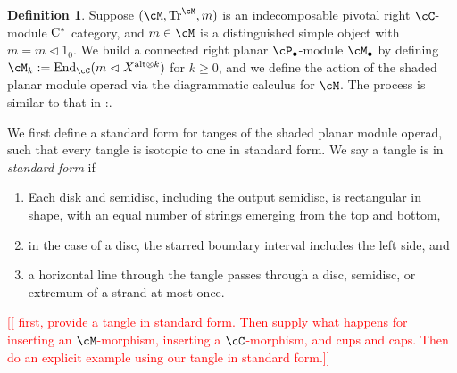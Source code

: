 \documentclass[11pt]{article}
\theoremstyle{plain}
\theoremstyle{definition}
\newtheorem{defn}[thm]{Definition}
\DeclareMathOperator{\End}{End}
\DeclareMathOperator{\Tr}{Tr}
\newcommand{\Cstar}{\rm{C^*}}
\newcommand{\nn}[1]{\textcolor{red}{[[#1]]}}
\begin{document}
\begin{defn}
Suppose $(\cM, \Tr^\cM, m)$ is an indecomposable pivotal right $\cC$-module $\Cstar$ category, and $m\in \cM$ is a distinguished simple object with $m= m \vartriangleleft 1_0$.
 We build a connected right planar $\cP_\bullet$-module $\cM_\bullet$ by defining $\cM_k := \End_\cC( m \vartriangleleft X^{\text{alt}\otimes k})$ for $k\geq 0$, and we define the action of the shaded planar module operad via the diagrammatic calculus for $\cM$. The process is similar to that in \cite[Def.~3.2]{MR2812459}:.
 
We first define a standard form for tanges of the shaded planar module operad, such that every tangle is isotopic to one in standard form. We say a tangle is in \textit{standard form} if 
\begin{enumerate}[label={\rm(SF\arabic*)}]
 \item Each disk and semidisc, including the output semidisc, is rectangular in shape, with an equal number of strings emerging from the top and bottom,
 \item in the case of a disc, the starred boundary interval includes the left side, and 
 \item a horizontal line through the tangle passes through a disc, semidisc, or extremum of a strand at most once. 
\end{enumerate}

\nn{
first, provide a tangle in standard form.
Then supply what happens for inserting an $\cM$-morphism, inserting a $\cC$-morphism, and cups and caps.
Then do an explicit example using our tangle in standard form.}


\end{defn}
\end{document}
